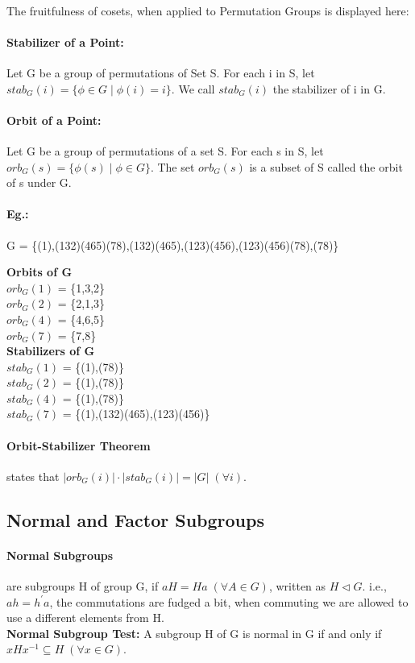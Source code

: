 \paragraph{} The fruitfulness of cosets, when applied to Permutation Groups is displayed here:
\paragraph{Stabilizer of a Point:} Let G be a group of permutations of Set S. For each i in S, let $stab_G(i) = \{\phi \in G \;|\; \phi(i) = i\}$. We call $stab_G(i)$ the stabilizer of i in G.
\paragraph{Orbit of a Point:} Let G be a group of permutations of a set S. For each s in S, let $orb_G(s) = \{\phi(s) \;|\; \phi \in G\}$. The set $orb_G(s)$ is a subset of S called the orbit of s under G.
\paragraph{Eg.:} G = \{(1),(132)(465)(78),(132)(465),(123)(456),(123)(456)(78),(78)\}
\begin{multicols}{2}[]
    \textbf{Orbits of G}\\
    $orb_G(1)$ = \{1,3,2\}\\
    $orb_G(2)$ = \{2,1,3\}\\
    $orb_G(4)$ = \{4,6,5\}\\
    $orb_G(7)$ = \{7,8\}\\
    \textbf{Stabilizers of G}\\
    $stab_G(1)$ = \{(1),(78)\}\\
    $stab_G(2)$ = \{(1),(78)\}\\
    $stab_G(4)$ = \{(1),(78)\}\\
    $stab_G(7)$ = \{(1),(132)(465),(123)(456)\}
\end{multicols}
\paragraph{Orbit-Stabilizer Theorem} states that $|orb_G(i)| \cdot |stab_G(i)| = |G| \; (\forall i)$.


\subsection{Normal and Factor Subgroups}

\paragraph{Normal Subgroups} are subgroups H of group G, if $aH = Ha \;(\forall A \in G)$, written as $H \lhd G$. i.e., $ah = h^\prime a$, the commutations are fudged a bit, when commuting we are allowed to use a different elements from H.
\\ \textbf{Normal Subgroup Test:} A subgroup H of G is normal in G if and only if $xHx^{-1} \subseteq H \;(\forall x \in G)$.
